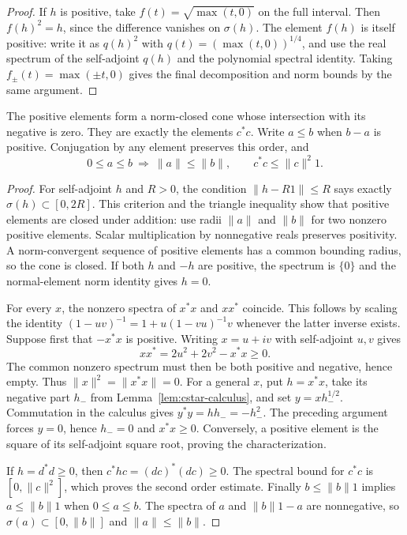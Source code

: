 \documentclass[11pt]{article}
\numberwithin{equation}{section}
\begin{document}
\begin{proof}
If $h$ is positive, take $f(t)=\sqrt{\max(t,0)}$ on the full interval.
Then $f(h)^2=h$, since the difference vanishes on $\sigma(h)$.
The element $f(h)$ is itself positive: write it as $q(h)^2$ with
$q(t)=(\max(t,0))^{1/4}$, and use the real spectrum of the self-adjoint
$q(h)$ and the polynomial spectral identity.
Taking $f_\pm(t)=\max(\pm t,0)$ gives the final decomposition and norm
bounds by the same argument.
\end{proof}

\begin{lemma}
\label{lem:cstar-order}
The positive elements form a norm-closed cone whose intersection with its
negative is zero.  They are exactly the elements $c^*c$.
Write $a\leq b$ when $b-a$ is positive.  Conjugation by any element preserves
this order, and
\[
 0\leq a\leq b\ \Longrightarrow\ \|a\|\leq\|b\|,
 \qquad c^*c\leq\|c\|^2 1.
\]
\end{lemma}

\begin{proof}
For self-adjoint $h$ and $R>0$, the condition
$\|h-R1\|\leq R$ says exactly $\sigma(h)\subset[0,2R]$.
This criterion and the triangle inequality show that positive elements
are closed under addition: use radii $\|a\|$ and $\|b\|$ for two nonzero
positive elements.  Scalar multiplication by nonnegative reals preserves
positivity.  A norm-convergent sequence of positive elements has a common
bounding radius, so the cone is closed.  If both $h$ and $-h$ are positive,
the spectrum is $\{0\}$ and the normal-element norm identity gives $h=0$.

For every $x$, the nonzero spectra of $x^*x$ and $xx^*$ coincide.
This follows by scaling the identity
$(1-uv)^{-1}=1+u(1-vu)^{-1}v$ whenever the latter inverse exists.
Suppose first that $-x^*x$ is positive.  Writing $x=u+iv$ with self-adjoint
$u,v$ gives
\[
 xx^*=2u^2+2v^2-x^*x\geq0.
\]
The common nonzero spectrum must then be both positive and negative, hence
empty.  Thus $\|x\|^2=\|x^*x\|=0$.
For a general $x$, put $h=x^*x$, take its negative part $h_-$ from
Lemma~\ref{lem:cstar-calculus}, and set $y=xh_-^{1/2}$.
Commutation in the calculus gives $y^*y=hh_-=-h_-^2$.
The preceding argument forces $y=0$, hence $h_-=0$ and $x^*x\geq0$.
Conversely, a positive element is the square of its self-adjoint square
root, proving the characterization.

If $h=d^*d\geq0$, then $c^*hc=(dc)^*(dc)\geq0$.
The spectral bound for $c^*c$ is $[0,\|c\|^2]$, which proves the second
order estimate.  Finally $b\leq\|b\|1$ implies
$a\leq\|b\|1$ when $0\leq a\leq b$.
The spectra of $a$ and $\|b\|1-a$ are nonnegative, so
$\sigma(a)\subset[0,\|b\|]$ and $\|a\|\leq\|b\|$.
\end{proof}
\end{document}
